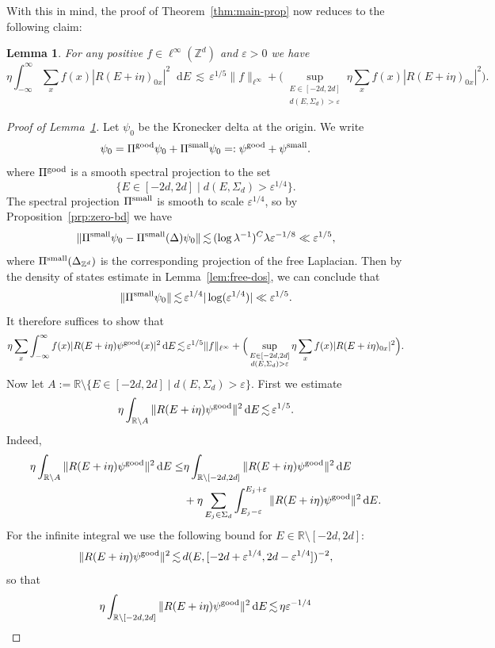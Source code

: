 \documentclass[11pt]{amsart}
\def\Real{{\mathbb R}}
\def\bbZ{{\mathbb Z}}
\def\Z{{\mathbb{Z}}}
\def\eps{{\varepsilon}}
\newcommand{\diff}{\mathop{}\!\mathrm{d}}
\def\lsim{{\,\lesssim\,}}
\numberwithin{equation}{section}
\numberwithin{theorem}{section}
\newtheorem{lemma}[theorem]{Lemma}
\begin{document}
With this in mind, the proof of Theorem~\ref{thm:main-prop} now reduces to the following claim:
\begin{lemma}
\label{lem:integral-to-max}
For any positive $f\in\ell^\infty(\bbZ^d)$ and $\eps>0$ we have
\[
\eta \int_{-\infty}^\infty \sum_x f(x) |R(E+i\eta)_{0x}|^2\diff E
\lsim \eps^{1/5} \|f\|_{\ell^\infty} + \Big(\sup_{\substack{E\in [-2d,2d]\\ d(E,\Sigma_d)>\eps}}
\eta \sum_x f(x) |R(E+i\eta)_{0x}|^2 \Big).
\]
\end{lemma}
\begin{proof}[Proof of Lemma~\ref{lem:integral-to-max}]
Let $\psi_0$ be the Kronecker delta at the origin.  We write
\[
\psi_0 = \Pi^{\rm good} \psi_0 + \Pi^{\rm small}\psi_0
=: \psi^{\rm good} + \psi^{\rm small}.
\]
where $\Pi^{\rm good}$ is a smooth spectral projection to the set
\[
\{E \in [-2d,2d] \mid d(E,\Sigma_d) > \eps^{1/4}\}.
\]
The spectral projection $\Pi^{\rm small}$ is smooth to scale $\eps^{1/4}$, so by Proposition~\ref{prp:zero-bd} we have
\[
\|\Pi^{\rm small}\psi_0 - \Pi^{\rm small}(\Delta)\psi_0\| \lsim (\log \lambda^{-1})^C
\lambda \eps^{-1/8} \ll \eps^{1/5},
\]
where $\Pi^{\rm small}(\Delta_{\Z^d})$ is the corresponding
projection of the free Laplacian.  Then by the density of states estimate in Lemma~\ref{lem:free-dos}, we can conclude that
\[
\|\Pi^{\rm small}\psi_0\| \lsim \eps^{1/4}|\log(\eps^{1/4})| \ll \eps^{1/5}.
\]
It therefore suffices to show that
\[
\eta \sum_x \int_{-\infty}^\infty f(x) |R(E+i\eta)\psi^{\rm good}(x)|^2 \diff E
\lsim
\eps^{1/5}\|f\|_{\ell^\infty}
+ \Big(\sup_{\substack{E\in [-2d,2d]\\ d(E,\Sigma_d)>\eps}}
\eta \sum_x f(x) |R(E+i\eta)_{0x}|^2 \Big).
\]
Now let $A := \Real \setminus \{E \in [-2d,2d] \mid d(E,\Sigma_d) > \eps\}$.  First we estimate
\[
\eta \int_{\Real \setminus A} \|R(E+i\eta)\psi^{\rm good}\|^2 \diff E \lsim \eps^{1/5}.
\]
Indeed,
\begin{align*}
\eta \int_{\Real\setminus A} \|R(E+i\eta)\psi^{\rm good}\|^2 \diff E
\leq &\eta \int_{\Real\setminus[-2d,2d]} \|R(E+i\eta)\psi^{\rm good}\|^2 \diff E \\
&+ \eta \sum_{E_j\in\Sigma_d}\int_{E_j-\eps}^{E_j+\eps} \|R(E+i\eta)\psi^{\rm good}\|^2 \diff E.
\end{align*}
For the infinite integral we use the following bound for $E\in \Real\setminus [-2d,2d]$:
\[
\|R(E+i\eta)\psi^{\rm good}\|^2 \lsim d(E,[-2d+\eps^{1/4},2d-\eps^{1/4}])^{-2},
\]
so that
\[
\eta \int_{\Real\setminus[-2d,2d]} \|R(E+i\eta)\psi^{\rm good}\|^2 \diff E \lsim \eta \eps^{-1/4}
\]
\end{proof}
\end{document}
